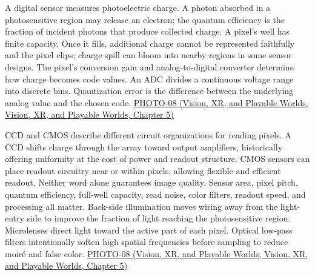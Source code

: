 A digital sensor measures photoelectric charge. A photon absorbed in a photosensitive region may release an electron; the quantum efficiency is the fraction of incident photons that produce collected charge. A pixel's well has finite capacity. Once it fills, additional charge cannot be represented faithfully and the pixel clips; charge spill can bloom into nearby regions in some sensor designs. The pixel's conversion gain and analog-to-digital converter determine how charge becomes code values. An ADC divides a continuous voltage range into discrete bins. Quantization error is the difference between the underlying analog value and the chosen code. \href{../07-Vision-XR-and-Playable-Worlds/main.pdf\#nameddest=04-visual-computing-ii-ch036-photo-08---photography-session-08}{PHOTO-08 (Vision, XR, and Playable Worlds, Vision, XR, and Playable Worlds, Chapter 5)}

CCD and CMOS describe different circuit organizations for reading pixels. A CCD shifts charge through the array toward output amplifiers, historically offering uniformity at the cost of power and readout structure. CMOS sensors can place readout circuitry near or within pixels, allowing flexible and efficient readout. Neither word alone guarantees image quality. Sensor area, pixel pitch, quantum efficiency, full-well capacity, read noise, color filters, readout speed, and processing all matter. Back-side illumination moves wiring away from the light-entry side to improve the fraction of light reaching the photosensitive region. Microlenses direct light toward the active part of each pixel. Optical low-pass filters intentionally soften high spatial frequencies before sampling to reduce moiré and false color. \href{../07-Vision-XR-and-Playable-Worlds/main.pdf\#nameddest=04-visual-computing-ii-ch036-photo-08---photography-session-08}{PHOTO-08 (Vision, XR, and Playable Worlds, Vision, XR, and Playable Worlds, Chapter 5)}

